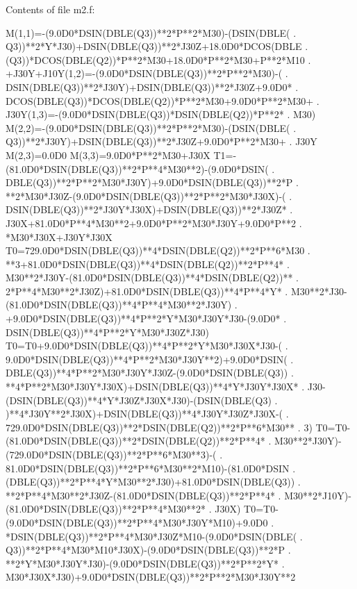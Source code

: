 \newpage

Contents of file m2.f:
\begin{framedverbatim}
      M(1,1)=-(9.0D0*DSIN(DBLE(Q3))**2*P**2*M30)-(DSIN(DBLE(
     . Q3))**2*Y*J30)+DSIN(DBLE(Q3))**2*J30Z+18.0D0*DCOS(DBLE
     . (Q3))*DCOS(DBLE(Q2))*P**2*M30+18.0D0*P**2*M30+P**2*M10
     . +J30Y+J10Y(1,2)=-(9.0D0*DSIN(DBLE(Q3))**2*P**2*M30)-(
     . DSIN(DBLE(Q3))**2*J30Y)+DSIN(DBLE(Q3))**2*J30Z+9.0D0*
     . DCOS(DBLE(Q3))*DCOS(DBLE(Q2))*P**2*M30+9.0D0*P**2*M30+
     . J30Y(1,3)=-(9.0D0*DSIN(DBLE(Q3))*DSIN(DBLE(Q2))*P**2*
     . M30)
      M(2,2)=-(9.0D0*DSIN(DBLE(Q3))**2*P**2*M30)-(DSIN(DBLE(
     . Q3))**2*J30Y)+DSIN(DBLE(Q3))**2*J30Z+9.0D0*P**2*M30+
     . J30Y
      M(2,3)=0.0D0
      M(3,3)=9.0D0*P**2*M30+J30X
      T1=-(81.0D0*DSIN(DBLE(Q3))**2*P**4*M30**2)-(9.0D0*DSIN(
     . DBLE(Q3))**2*P**2*M30*J30Y)+9.0D0*DSIN(DBLE(Q3))**2*P
     . **2*M30*J30Z-(9.0D0*DSIN(DBLE(Q3))**2*P**2*M30*J30X)-(
     . DSIN(DBLE(Q3))**2*J30Y*J30X)+DSIN(DBLE(Q3))**2*J30Z*
     . J30X+81.0D0*P**4*M30**2+9.0D0*P**2*M30*J30Y+9.0D0*P**2
     . *M30*J30X+J30Y*J30X
      T0=729.0D0*DSIN(DBLE(Q3))**4*DSIN(DBLE(Q2))**2*P**6*M30
     . **3+81.0D0*DSIN(DBLE(Q3))**4*DSIN(DBLE(Q2))**2*P**4*
     . M30**2*J30Y-(81.0D0*DSIN(DBLE(Q3))**4*DSIN(DBLE(Q2))**
     . 2*P**4*M30**2*J30Z)+81.0D0*DSIN(DBLE(Q3))**4*P**4*Y*
     . M30**2*J30-(81.0D0*DSIN(DBLE(Q3))**4*P**4*M30**2*J30Y)
     . +9.0D0*DSIN(DBLE(Q3))**4*P**2*Y*M30*J30Y*J30-(9.0D0*
     . DSIN(DBLE(Q3))**4*P**2*Y*M30*J30Z*J30)
      T0=T0+9.0D0*DSIN(DBLE(Q3))**4*P**2*Y*M30*J30X*J30-(
     . 9.0D0*DSIN(DBLE(Q3))**4*P**2*M30*J30Y**2)+9.0D0*DSIN(
     . DBLE(Q3))**4*P**2*M30*J30Y*J30Z-(9.0D0*DSIN(DBLE(Q3))
     . **4*P**2*M30*J30Y*J30X)+DSIN(DBLE(Q3))**4*Y*J30Y*J30X*
     . J30-(DSIN(DBLE(Q3))**4*Y*J30Z*J30X*J30)-(DSIN(DBLE(Q3)
     . )**4*J30Y**2*J30X)+DSIN(DBLE(Q3))**4*J30Y*J30Z*J30X-(
     . 729.0D0*DSIN(DBLE(Q3))**2*DSIN(DBLE(Q2))**2*P**6*M30**
     . 3)
      T0=T0-(81.0D0*DSIN(DBLE(Q3))**2*DSIN(DBLE(Q2))**2*P**4*
     . M30**2*J30Y)-(729.0D0*DSIN(DBLE(Q3))**2*P**6*M30**3)-(
     . 81.0D0*DSIN(DBLE(Q3))**2*P**6*M30**2*M10)-(81.0D0*DSIN
     . (DBLE(Q3))**2*P**4*Y*M30**2*J30)+81.0D0*DSIN(DBLE(Q3))
     . **2*P**4*M30**2*J30Z-(81.0D0*DSIN(DBLE(Q3))**2*P**4*
     . M30**2*J10Y)-(81.0D0*DSIN(DBLE(Q3))**2*P**4*M30**2*
     . J30X)
      T0=T0-(9.0D0*DSIN(DBLE(Q3))**2*P**4*M30*J30Y*M10)+9.0D0
     . *DSIN(DBLE(Q3))**2*P**4*M30*J30Z*M10-(9.0D0*DSIN(DBLE(
     . Q3))**2*P**4*M30*M10*J30X)-(9.0D0*DSIN(DBLE(Q3))**2*P
     . **2*Y*M30*J30Y*J30)-(9.0D0*DSIN(DBLE(Q3))**2*P**2*Y*
     . M30*J30X*J30)+9.0D0*DSIN(DBLE(Q3))**2*P**2*M30*J30Y**2

\end{framedverbatim}
